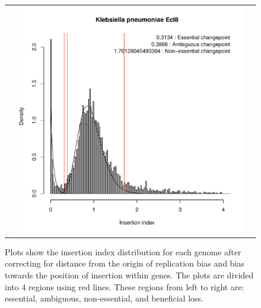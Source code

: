 \documentclass[12pt,letterpaper]{article}
\begin{document}
\begin{figure}
\begin{tabular}{c c c}
&\includegraphics[page=13, scale=0.25]{essentiality-normalised.pdf}&\\
\end{tabular}
\caption{Plots show the insertion index distribution for each genome after correcting for distance from the origin of replication bias and bias towards the position of insertion within genes. The plots are divided into 4 regions using red lines. These regions from left to right are: essential, ambiguous, non-essential, and beneficial loss.}
\label{fig:iidist-species-normalised}
\end{figure}
\end{document}
